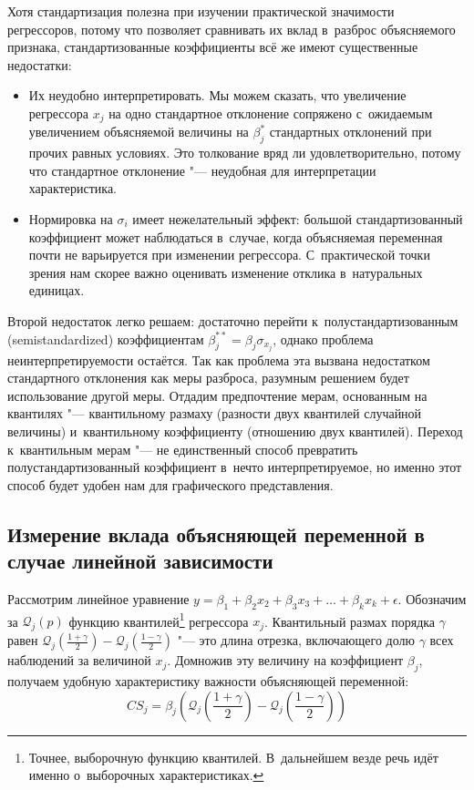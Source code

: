 \documentclass[11pt]{article}
\begin{document}
Хотя стандартизация полезна при изучении практической значимости регрессоров, потому что позволяет сравнивать их вклад в~разброс объясняемого признака, стандартизованные коэффициенты всё же имеют существенные недостатки:
\begin{itemize}
	\item Их неудобно интерпретировать. Мы можем сказать, что увеличение регрессора $x_j$ на одно стандартное отклонение сопряжено с~ожидаемым увеличением объясняемой величины на $\beta_j^*$ стандартных отклонений при прочих равных условиях.	Это толкование вряд ли удовлетворительно, потому что стандартное отклонение "--- неудобная для интерпретации характеристика.
	\item Нормировка на $\sigma_i$ имеет нежелательный эффект: большой стандартизованный коэффициент может наблюдаться в~случае, когда объясняемая переменная почти не варьируется при изменении регрессора. С~практической точки зрения нам скорее важно оценивать изменение отклика в~натуральных единицах.
\end{itemize}

Второй недостаток легко решаем: достаточно перейти к~полустандартизованным (semistandardized) коэффициентам $\beta_j^{**} = \beta_j\sigma_{x_j}$, однако проблема неинтерпретируемости остаётся. Так как проблема эта вызвана недостатком стандартного отклонения как меры разброса, разумным решением будет использование другой меры. Отдадим предпочтение мерам, основанным на квантилях "--- квантильному размаху (разности двух квантилей случайной величины) и~квантильному коэффициенту (отношению двух квантилей). Переход к~квантильным мерам "--- не единственный способ превратить полустандартизованный коэффициент в~нечто интерпретируемое, но именно этот способ будет удобен нам для графического представления.

\subsection*{Измерение вклада объясняющей переменной в случае линейной зависимости}

Рассмотрим линейное уравнение $y = \beta_1 + \beta_2x_2 + \beta_3x_3 + \ldots + \beta_kx_k + \epsilon$. 
Обозначим за $\mathcal{Q}_j(p)$ функцию квантилей\footnote{Точнее, выборочную функцию квантилей. В~дальнейшем везде речь идёт именно о~выборочных характеристиках.} регрессора $x_j$. Квантильный размах порядка $\gamma$ равен $\mathcal{Q}_j\left(\frac{1+\gamma}{2}\right)-\mathcal{Q}_j\left(\frac{1-\gamma}{2}\right)$ "--- это длина отрезка, включающего долю $\gamma$ всех наблюдений за величиной $x_j$. Домножив эту величину на коэффициент $\beta_j$, получаем удобную характеристику важности объясняющей переменной:
\[CS_j = \beta_j\left(\mathcal{Q}_j\left(\frac{1+\gamma}{2}\right)-\mathcal{Q}_j\left(\frac{1-\gamma}{2}\right)\right)\]
\end{document}
